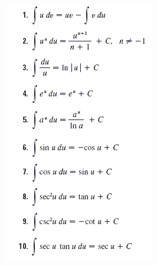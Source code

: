 \begin{table}[H]
\begin{minipage}{0.45\linewidth}
\includegraphics[width=\linewidth]{integral.png}
\label{fig:integral}
\end{minipage}
\end{table}

